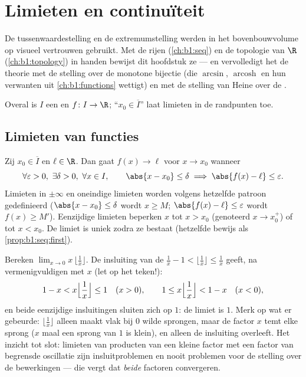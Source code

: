 \chapter{Limieten en continuïteit}\label{ch:b1:continuity}

De tussenwaardestelling en de extremumstelling werden in het
bovenbouwvolume op visueel vertrouwen gebruikt. Met de rijen
(\cref{ch:b1:seq}) en de topologie van $\R$ (\cref{ch:b1:topology}) in
handen bewijst dit hoofdstuk ze --- en vervolledigt het de theorie met de
stelling over de monotone bijectie (die $\arcsin$,
$\operatorname{arcosh}$ en hun verwanten uit \cref{ch:b1:functions}
wettigt) en met de stelling van Heine over de .

Overal is $I$ een  en $f \colon I \to \R$; ``$x_0 \in \overline
I$'' laat limieten in de randpunten toe.

\section{Limieten van functies}

\begin{definition}\label{def:b1:continuity:limit}
Zij $x_0 \in \overline{I}$ en $\ell \in \R$. Dan gaat $f(x) \to \ell$
voor $x \to x_0$ wanneer
\[
\forall \varepsilon > 0,\ \exists \delta > 0,\ \forall x \in I,
\qquad \abs{x - x_0} \leq \delta \implies \abs{f(x) - \ell} \leq
\varepsilon .
\]
Limieten in $\pm\infty$ en oneindige limieten worden volgens hetzelfde
patroon gedefinieerd ($\abs{x - x_0} \leq \delta$ wordt $x \geq M$;
$\abs{f(x) - \ell} \leq \varepsilon$ wordt $f(x) \geq M'$). Eenzijdige
limieten beperken $x$ tot $x > x_0$ (genoteerd $x \to x_0^+$) of tot $x <
x_0$. De limiet is uniek zodra ze bestaat (hetzelfde bewijs als
\cref{prop:b1:seq:first}).
\end{definition}

\begin{example}\label{ex:b1:continuity:floorlimit}
Bereken $\lim_{x \to 0} x\,\bigl\lfloor \frac1x \bigr\rfloor$. De
insluiting van de  $\frac1x - 1 < \lfloor \frac1x \rfloor \leq
\frac1x$ geeft, na vermenigvuldigen met $x$ (let op het teken!):
\[
1 - x < x\Bigl\lfloor \frac1x \Bigr\rfloor \leq 1 \quad (x > 0),
\qquad
1 \leq x\Bigl\lfloor \frac1x \Bigr\rfloor < 1 - x \quad (x < 0),
\]
en beide eenzijdige insluitingen sluiten zich op $1$: de limiet is $1$.
Merk op wat er gebeurde: $\lfloor \frac1x\rfloor$ alleen maakt vlak bij
$0$ wilde sprongen, maar de factor $x$ temt elke sprong ($x$ maal een
sprong van $1$ is klein), en alleen de insluiting overleeft. Het inzicht
tot slot: limieten van producten van een kleine factor met een factor van
begrensde oscillatie zijn insluitproblemen en nooit problemen voor de
stelling over de bewerkingen --- die vergt dat \emph{beide} factoren
convergeren.
\end{example}


